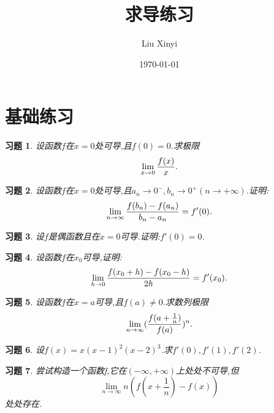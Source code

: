 \documentclass{article}
\title{求导练习}
\author{Liu Xinyi}
\date{\today}
\newtheorem{exer}{习题}[section]
\begin{document}
    
\maketitle

\section{基础练习}

\begin{exer}
    设函数$f$在$x=0$处可导,且$f(0)=0$.求极限
    $$
    \lim_{x\to 0}\frac{f(x)}{x}.\\
    $$
\end{exer}
\vspace*{80pt}


\begin{exer}
    设函数$f$在$x=0$处可导,且$a_n\to 0^-,b_n \to 0^+(n\to +\infty)$.证明:
    $$
    \lim_{n\to \infty}\frac{f(b_n)-f(a_n)}{b_n-a_n}=f'(0).\\
    $$
\end{exer}
\vspace*{80pt}

\begin{exer}
    设$f$是偶函数且在$x=0$可导.证明:$f'(0)=0$.\\
\end{exer}
\vspace*{80pt}

\begin{exer}
    设函数$f$在$x_0$可导,证明:
    $$
    \lim_{h\to 0}\frac{f(x_0+h)-f(x_0-h)}{2h}=f'(x_0).\\
    $$
\end{exer}
\vspace*{80pt}

\begin{exer}
    设函数$f$在$x=a$可导,且$f(a)\neq 0$.求数列极限
    $$
    \lim_{n\to\infty}(\frac{f(a+\frac1n)}{f(a)})^n.\\
    $$
\end{exer}
\vspace*{80pt}

\begin{exer}
    设$f(x)=x(x-1)^2(x-2)^3$.求$f'(0),f'(1),f'(2)$.\\
\end{exer}
\vspace*{80pt}

\begin{exer}
    尝试构造一个函数f,它在$(-\infty,+\infty)$上处处不可导,但
    $$
    \lim_{n\to \infty}n(f(x+\frac1n)-f(x))
    $$
    处处存在.\\
\end{exer}
\vspace*{80pt}
\end{document}
